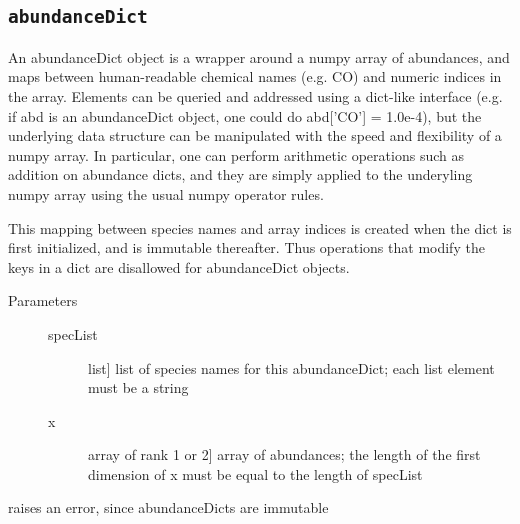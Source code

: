 \documentclass[letterpaper,10pt,english]{sphinxmanual}
\begin{document}
\subsection{\texttt{abundanceDict}}
\label{fulldoc:sssec-full-abundancedict}\label{fulldoc:abundancedict}

\begin{fulllineitems}
\label{fulldoc:despotic.chemistry.abundanceDict}
An abundanceDict object is a wrapper around a numpy array of
abundances, and maps between human-readable chemical names
(e.g. CO) and numeric indices in the array. Elements can be
queried and addressed using a dict-like interface (e.g. if abd is
an abundanceDict object, one could do abd{[}'CO'{]} = 1.0e-4), but the
underlying data structure can be manipulated with the speed and
flexibility of a numpy array. In particular, one can perform
arithmetic operations such as addition on abundance dicts, and they
are simply applied to the underyling numpy array using the usual
numpy operator rules.

This mapping between species names and array indices is created
when the dict is first initialized, and is immutable
thereafter. Thus operations that modify the keys in a dict are
disallowed for abundanceDict objects.
\begin{description}
\item[{Parameters}] \leavevmode\begin{description}
\item[{specList}] \leavevmode{[}list{]}
list of species names for this abundanceDict; each list
element must be a string

\item[{x}] \leavevmode{[}array of rank 1 or 2{]}
array of abundances; the length of the first dimension of
x must be equal to the length of specList

\end{description}

\end{description}

\begin{fulllineitems}
\label{fulldoc:despotic.chemistry.abundanceDict.clear}
raises an error, since abundanceDicts are
immutable


\end{fulllineitems}
\end{fulllineitems}
\end{document}
